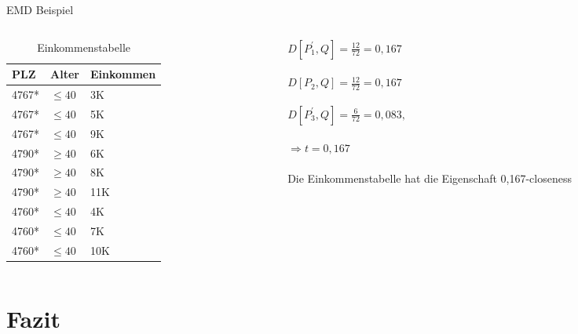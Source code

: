 \begin{frame} {EMD Beispiel}
	
	\begin{columns}[T]
		\begin{column}{0.5\textwidth}
			\begin{table}[]
				\centering
				\label{tclossenessExample}
				\begin{tabular}{|l|l|l|}
					\hline
					\textbf{PLZ}   & \textbf{Alter}    & \textbf{Einkommen} \\\hline
					4767* & $\le 40$ & 3K \\
					4767* & $\le 40$ & 5K \\
					4767* & $\le 40$ & 9K \\\hline
					4790* & $\ge 40$ & 6K \\
					4790* & $\ge 40$ & 8K \\
					4790* & $\ge 40$ & 11K \\\hline
					4760* & $\le 40$ & 4K \\
					4760* & $\le 40$ & 7K \\
					4760* & $\le 40$ & 10K \\\hline
				\end{tabular}
				\caption{Einkommenstabelle}
			\end{table}
		\end{column}
		
		\begin{column}{0.5\textwidth}
			$D[P_1^{'},Q]=\frac{12}{72} = 0,167$\\
			\ \\
			$D[P_2,Q]=\frac{12}{72} = 0,167$\\
			\ \\
			$D[P_3^{'},Q]=\frac{6}{72} = 0,083,$\\
			\ \\
			$\Rightarrow t=0,167$\\
			\ \\
			Die Einkommenstabelle hat die Eigenschaft 0,167-closeness	
		\end{column}
	\end{columns}

\end{frame}

\section{Fazit}

